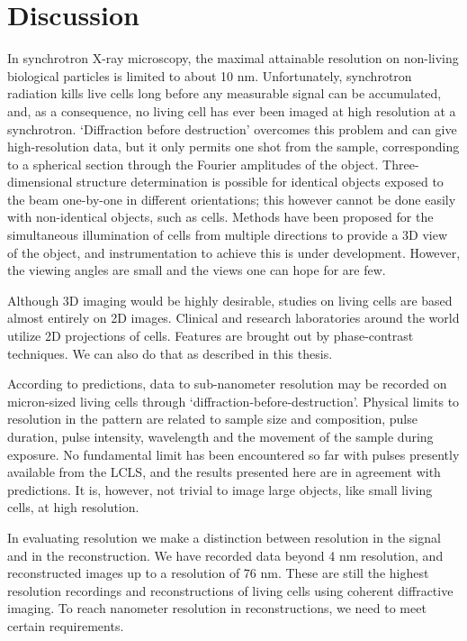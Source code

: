 \chapter{Discussion}

In synchrotron X-ray microscopy, the maximal attainable resolution on non-living biological particles is limited to about 10 nm. Unfortunately, synchrotron radiation kills live cells long before any measurable signal can be accumulated, and, as a consequence, no living cell has ever been imaged at high resolution at a synchrotron. ‘Diffraction before destruction’ overcomes this problem and can give high-resolution data, but it only permits one shot from the sample, corresponding to a spherical section through the Fourier amplitudes of the object. Three-dimensional structure determination is possible for identical objects exposed to the beam one-by-one in different orientations; this however cannot be done easily with non-identical objects, such as cells. Methods have been proposed for the simultaneous illumination of cells from multiple directions to provide a 3D view of the object, and instrumentation to achieve this is under development. However, the viewing angles are small and the views one can hope for are few. 

Although 3D imaging would be highly desirable, studies on living cells are based almost entirely on 2D images. Clinical and research laboratories around the world utilize 2D projections of cells. Features are brought out by phase-contrast techniques. We can also do that as described in this thesis.
 
According to predictions, data to sub-nanometer resolution may be recorded on micron-sized living cells through ‘diffraction-before-destruction’. Physical limits to resolution in the pattern are related to sample size and composition, pulse duration, pulse intensity, wavelength and the movement of the sample during exposure. No fundamental limit has been encountered so far with pulses presently available from the LCLS, and the results presented here are in agreement with predictions. It is, however, not trivial to image large objects, like small living cells, at high resolution.

In evaluating resolution we make a distinction between resolution in the signal and in the reconstruction. We have recorded data beyond 4 nm resolution, and reconstructed images up to a resolution of 76 nm. These are still the highest resolution recordings and reconstructions of living cells using coherent diffractive imaging. To reach nanometer resolution in reconstructions, we need to meet certain requirements.


